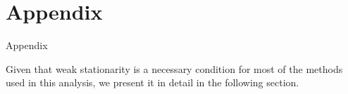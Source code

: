\section{Appendix}
\begin{frame}{Appendix}
    \begin{center}
        Given that weak stationarity is a necessary condition for most of the methods used in this analysis, we present it in detail in the following section.
    \end{center}
\end{frame}